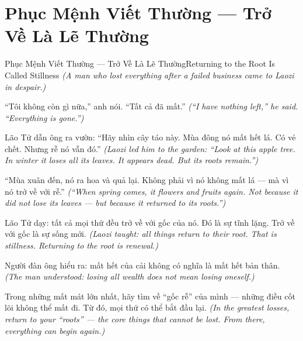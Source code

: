 \section{Phục Mệnh Viết Thường — Trở Về Là Lẽ Thường}
\begin{truyen}{Phục Mệnh Viết Thường — Trở Về Là Lẽ Thường}{Returning to the Root Is Called Stillness}
\textit{(A man who lost everything after a failed business came to Laozi in despair.)}

``Tôi không còn gì nữa,'' anh nói. ``Tất cả đã mất.''
\textit{(``I have nothing left,'' he said. ``Everything is gone.'')}

Lão Tử dẫn ông ra vườn: ``Hãy nhìn cây táo này. Mùa đông nó mất hết lá. Có vẻ chết. Nhưng rễ nó vẫn đó.''
\textit{(Laozi led him to the garden: ``Look at this apple tree. In winter it loses all its leaves. It appears dead. But its roots remain.'')}

``Mùa xuân đến, nó ra hoa và quả lại. Không phải vì nó không mất lá — mà vì nó trở về với rễ.''
\textit{(``When spring comes, it flowers and fruits again. Not because it did not lose its leaves — but because it returned to its roots.'')}

Lão Tử dạy: tất cả mọi thứ đều trở về với gốc của nó. Đó là sự tĩnh lặng. Trở về với gốc là sự sống mới.
\textit{(Laozi taught: all things return to their root. That is stillness. Returning to the root is renewal.)}

Người đàn ông hiểu ra: mất hết của cải không có nghĩa là mất hết bản thân.
\textit{(The man understood: losing all wealth does not mean losing oneself.)}

\end{truyen}

\begin{baihoc}
Trong những mất mát lớn nhất, hãy tìm về ``gốc rễ'' của mình — những điều cốt lõi không thể mất đi. Từ đó, mọi thứ có thể bắt đầu lại.
\textit{(In the greatest losses, return to your ``roots'' — the core things that cannot be lost. From there, everything can begin again.)}
\end{baihoc}
\ngancach

